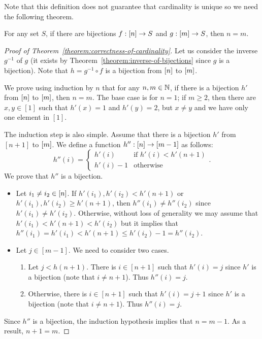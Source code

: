 Note that this definition does not guarantee that cardinality is unique so
we need the following theorem.
\begin{theorem}
\label{theorem:correctness-of-cardinality}
    For any set $S$, if there are bijections $f : {[{n}]} \to S$ and
    $g : {[{m}]} \to S$, then $n = m$.
\end{theorem}
\begin{proof}[Proof of Theorem~\ref{theorem:correctness-of-cardinality}]
    Let us consider the inverse $g^{-1}$ of $g$ (it exists by
    Theorem~\ref{theorem:inverse-of-bijections} since $g$ is a
    bijection). Note that $h = g^{-1} \circ f$
    is a bijection from ${[{n}]}$ to ${[{m}]}$.

    We prove using induction by $n$ that for any $n, m \in {\mathbb{N}}$,
    if there is a bijection $h'$ from ${[{n}]}$ to ${[{m}]}$, then $n = m$.
    The base case is for $n = 1$; if $m \ge 2$,
    then there are $x, y \in [1]$ such that $h'(x) = 1$ and $h'(y) = 2$, but
    $x \neq y$ and we have only one element in $[1]$.

    The induction step is also simple. Assume that there is a bijection $h'$ from
    $[n + 1]$ to ${[{m}]}$. We define a function
    $h'' : {[{n}]} \to {[{m - 1}]}$ as follows:
    \[
        h''(i) =
        \begin{cases}
            h'(i) & \text{if } h'(i) < h'(n + 1) \\
            h'(i) - 1 & \text{otherwise}
        \end{cases}.
    \]
    We prove that $h''$ is a bijection.
    \begin{itemize}
        \item Let $i_1 \neq i_2 \in {[{n}]}$. If
            $h'(i_1), h'(i_2) < h'(n + 1)$ or $h'(i_1), h'(i_2) \ge h'(n + 1)$,
            then $h''(i_1) \neq h''(i_2)$ since $h'(i_1) \neq h'(i_2)$.
            Otherwise, without loss of generality we may assume that
            $h'(i_1) < h'(n + 1) < h'(i_2)$ but it implies that
            $h''(i_1) = h'(i_1) < h'(n + 1) \le h'(i_2) - 1 = h''(i_2)$.
        \item Let $j \in [m - 1]$. We need to consider two cases.
            \begin{enumerate}
                \item Let $j < h(n + 1)$. There is $i \in [n + 1]$ such that
                    $h'(i) = j$ since $h'$ is a bijection
                    (note that $i \neq n + 1$). Thus $h''(i) = j$.
                \item Otherwise, there is $i \in [n + 1]$ such that
                    $h'(i) = j + 1$ since $h'$ is a bijection
                    (note that $i \neq n + 1$). Thus $h''(i) = j$.
            \end{enumerate}
    \end{itemize}
    Since $h''$ is a bijection, the induction hypothesis implies that
    $n = m - 1$. As a result, $n + 1 = m$.
\end{proof}


